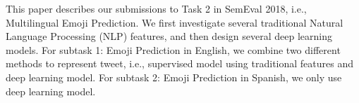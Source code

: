 This paper describes our submissions to Task 2 in SemEval 2018, i.e., Multilingual Emoji Prediction. We first investigate several traditional Natural Language Processing (NLP) features, and then design several deep learning models. For subtask 1: Emoji Prediction in English, we combine two different methods to represent tweet, i.e., supervised model using traditional features and deep learning model. For subtask 2: Emoji Prediction in Spanish, we only use deep learning model.
